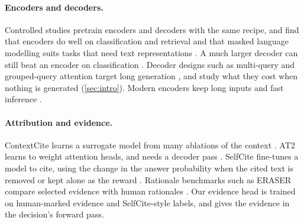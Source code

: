 \paragraph{Encoders and decoders.}
Controlled studies pretrain encoders and decoders with the same recipe, and find that encoders do well on classification and retrieval \citep{weller2025ettin} and that masked language modelling suits tasks that need text representations \citep{gisserotboukhlef2025mlm}.
A much larger decoder can still beat an encoder on classification \citep{zhao2024classification}.
Decoder designs such as multi-query and grouped-query attention target long generation \citep{mqa, gqa}, and \citet{prefillonly} study what they cost when nothing is generated (\cref{sec:intro}).
Modern encoders keep long inputs and fast inference \citep{modernbert, ultrabert}.

\paragraph{Attribution and evidence.}
ContextCite learns a surrogate model from many ablations of the context \citep{contextcite}.
AT2 learns to weight attention heads, and needs a decoder pass \citep{at2}.
SelfCite fine-tunes a model to cite, using the change in the answer probability when the cited text is removed or kept alone as the reward \citep{selfcite}.
Rationale benchmarks such as ERASER compare selected evidence with human rationales \citep{deyoung2020eraser}.
Our evidence head is trained on human-marked evidence and SelfCite-style labels, and gives the evidence in the decision's forward pass.
